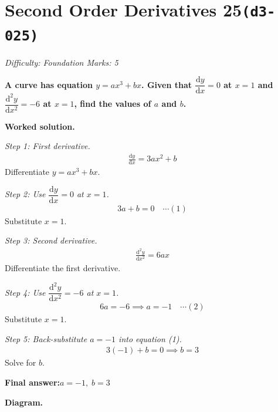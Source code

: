 \documentclass[11pt]{article}
\newcommand{\question}[1]{\par\medskip\noindent\textbf{#1}\par}
\begin{document}
\section*{Second Order Derivatives 25\quad\small\texttt{(d3-025)}}
\textit{Difficulty: Foundation \quad\textbar\quad Marks: 5}

\question{A curve has equation \( y = ax^3 + bx \). Given that \( \dfrac{\mathrm{d}y}{\mathrm{d}x} = 0 \) at \( x = 1 \) and \( \dfrac{\mathrm{d}^2y}{\mathrm{d}x^2} = -6 \) at \( x = 1 \), find the values of \( a \) and \( b \).}

\textbf{Worked solution.}

\textit{Step 1: First derivative.}
\[\begin{gathered}
\frac{\mathrm{d}y}{\mathrm{d}x} = 3ax^2 + b
\end{gathered}\]
Differentiate \( y = ax^3 + bx \).

\textit{Step 2: Use \( \dfrac{\mathrm{d}y}{\mathrm{d}x} = 0 \) at \( x = 1 \).}
\[\begin{gathered}
3a + b = 0 \quad \cdots (1)
\end{gathered}\]
Substitute \( x = 1 \).

\textit{Step 3: Second derivative.}
\[\begin{gathered}
\frac{\mathrm{d}^2y}{\mathrm{d}x^2} = 6ax
\end{gathered}\]
Differentiate the first derivative.

\textit{Step 4: Use \( \dfrac{\mathrm{d}^2y}{\mathrm{d}x^2} = -6 \) at \( x = 1 \).}
\[\begin{gathered}
6a = -6 \implies a = -1 \quad \cdots (2)
\end{gathered}\]
Substitute \( x = 1 \).

\textit{Step 5: Back-substitute \( a = -1 \) into equation (1).}
\[\begin{gathered}
3(-1) + b = 0 \implies b = 3
\end{gathered}\]
Solve for \( b \).

\begin{answerbox}
\textbf{Final answer:}\quad \(\displaystyle  a = -1,\; b = 3 \)
\end{answerbox}
\textbf{Diagram.}
\end{document}
